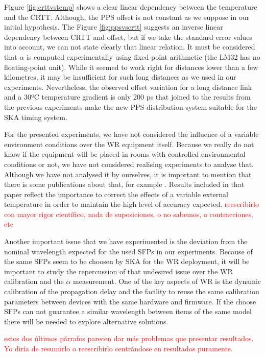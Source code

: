Figure \ref{fig:crttvstemp} shows a clear linear dependency between the 
temperature and the CRTT. Although, the PPS offset is not constant as 
we suppose in our initial hypothesis. The Figure \ref{fig:ppsvscrtt} suggests 
an inverse linear dependency between CRTT and offset, but if we take the 
standard error values into account, we can not state clearly that linear 
relation. It must be considered that $\alpha$ is computed experimentally using 
fixed-point arithmetic (the LM32 has no floating-point unit). While it seemed 
to work right for distances lower than a few kilometres, it may be insufficient 
for such long distances as we used in our experiments. Nevertheless, the 
observed offset variation for a long distance link and a 30ºC temperature 
gradient is only 200 ps that joined to the results from the previous 
experiments make the new PPS distribution system suitable for the SKA 
timing system.

For the presented experiments, we have not considered the influence of a variable environment conditions over the WR equipment itself. Because we really do not know if the equipment will be placed in rooms with controlled environmental conditions or not, we have not considered realising experiments to analyse that. Although we have not analysed it by ourselves, it is important to mention that there is some publications about that, for example \cite{Li2015a}. Results included in that paper reflect the importance to correct the effects of a variable external temperature in order to maintain the high level of accuracy expected. \textcolor{red}{reescribirlo con mayor rigor científico, nada de suposiciones, o no sabemos, o contracciones, etc}

Another important issue that we have experimented is the deviation from the nominal wavelength expected for the used SFPs in our experiments. Because of the same SFPs seem to be choosen by SKA for the WR deployment, it will be important to study the repercussion of that undesired issue over the WR calibration and the $\alpha$ measurement. One of the key aspects of WR is the dynamic calibration of the propagation delay and the facility to reuse the same calibration parameters between devices with the same hardware and firmware. If the choose SFPs can not guarantee a similar wavelength between items of the same model there will be needed to explore alternative solutions.

\textcolor{red}{estos dos últimos párrafos parecen dar más problemas que presentar resultados. Yo diría de resumirlo o reescribirlo centrándose en resultados puramente.}
